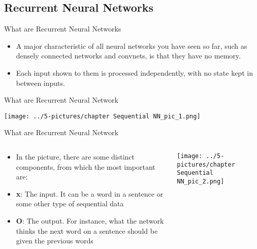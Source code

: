 \documentclass[11pt]{beamer}
\begin{document}
\subsection{Recurrent Neural Networks \\ \scalebox{0.8}{}}
%
\begin{frame}{What are Recurrent Neural Networks}
	\begin{itemize}
		\item A major characteristic of all neural networks you have seen so far, such as densely connected networks and convnets, is that they have no memory. 
		\item Each input shown to them is processed independently, with no state kept in between inputs.
	\end{itemize}
\end{frame}
\begin{frame}{What are Recurrent Neural Network}
	\begin{center}
	\texttt{[image: ../5-pictures/chapter Sequential NN\_pic\_1.png]}
	\end{center}
\end{frame}
\begin{frame}{What are Recurrent Neural Network}
\begin{columns}[T] %
\begin{column}{.48\textwidth}
        \begin{itemize}
		\item In the picture, there are some distinct components, from which the most important are:
		\item \textbf{x}: The input. It can be a word in a sentence or some other type of sequential data
		\item \textbf{O}: The output. For instance, what the network thinks the next word on a sentence should be given the previous words
        \end{itemize}
\end{column}%
\hfill%
\begin{column}{.48\textwidth}
        \texttt{[image: ../5-pictures/chapter Sequential NN\_pic\_2.png]}
\end{column}%
\end{columns}
\end{frame}
\end{document}

